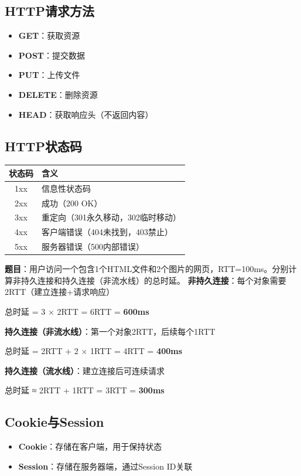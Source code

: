 \subsection{HTTP请求方法}
\begin{itemize}[leftmargin=2em,itemsep=0pt]
    \item \textbf{GET}：获取资源
    \item \textbf{POST}：提交数据
    \item \textbf{PUT}：上传文件
    \item \textbf{DELETE}：删除资源
    \item \textbf{HEAD}：获取响应头（不返回内容）
\end{itemize}

\subsection{HTTP状态码}
\begin{table}[htbp]
\centering\small
\begin{tabular}{cl}
\toprule
\textbf{状态码} & \textbf{含义} \\
\midrule
1xx & 信息性状态码 \\
2xx & 成功（200 OK） \\
3xx & 重定向（301永久移动，302临时移动） \\
4xx & 客户端错误（404未找到，403禁止） \\
5xx & 服务器错误（500内部错误） \\
\bottomrule
\end{tabular}
\end{table}

\begin{examplebox}[例题6.2 HTTP时延计算]
\textbf{题目}：用户访问一个包含1个HTML文件和2个图片的网页，RTT=100ms。分别计算非持久连接和持久连接（非流水线）的总时延。
\tcblower
\textbf{非持久连接}：每个对象需要2RTT（建立连接+请求响应）

总时延 = 3 × 2RTT = 6RTT = \textbf{600ms}

\textbf{持久连接（非流水线）}：第一个对象2RTT，后续每个1RTT

总时延 = 2RTT + 2 × 1RTT = 4RTT = \textbf{400ms}

\textbf{持久连接（流水线）}：建立连接后可连续请求

总时延 ≈ 2RTT + 1RTT = 3RTT = \textbf{300ms}
\end{examplebox}

\subsection{Cookie与Session}
\begin{itemize}[leftmargin=2em,itemsep=0pt]
    \item \textbf{Cookie}：存储在客户端，用于保持状态
    \item \textbf{Session}：存储在服务器端，通过Session ID关联
\end{itemize}

